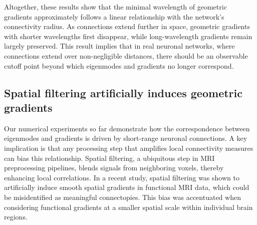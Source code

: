 \documentclass{article}
\begin{document}
Altogether, these results show that the minimal wavelength of geometric gradients approximately follows a linear relationship with the network's connectivity radius. As connections extend further in space, geometric gradients with shorter wavelengths first disappear, while long-wavelength gradients remain largely preserved. This result implies that in real neuronal networks, where connections extend over non-negligible distances, there should be an observable cutoff point beyond which eigenmodes and gradients no longer correspond.

\subsection*{Spatial filtering artificially induces geometric gradients}

Our numerical experiments so far demonstrate how the correspondence between eigenmodes and gradients is driven by short-range neuronal connections. A key implication is that any processing step that amplifies local connectivity measures can bias this relationship. Spatial filtering, a ubiquitous step in MRI preprocessing pipelines, blends signals from neighboring voxels, thereby enhancing local correlations. In a recent study\cite{watson2023connectopic}, spatial filtering was shown to artificially induce smooth spatial gradients in functional MRI data, which could be misidentified as meaningful connectopies\cite{haak2018connectopic}. This bias was accentuated when considering functional gradients at a smaller spatial scale within individual brain regions. 
\end{document}
